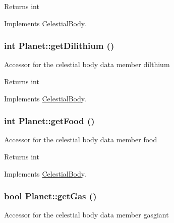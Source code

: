 \begin{DoxyReturn}{Returns}
int 
\end{DoxyReturn}


Implements \hyperlink{classCelestialBody}{CelestialBody}.

\hypertarget{classPlanet_a272240452921331e7220108df452a37d}{
\subsubsection[{getDilithium}]{\setlength{\rightskip}{0pt plus 5cm}int Planet::getDilithium ()}}
\label{d5/dec/classPlanet_a272240452921331e7220108df452a37d}
Accessor for the celestial body data member dilthium

\begin{DoxyReturn}{Returns}
int 
\end{DoxyReturn}


Implements \hyperlink{classCelestialBody}{CelestialBody}.

\hypertarget{classPlanet_a2b85fd628db9831d7ab5c7149b80cde3}{
\subsubsection[{getFood}]{\setlength{\rightskip}{0pt plus 5cm}int Planet::getFood ()}}
\label{d5/dec/classPlanet_a2b85fd628db9831d7ab5c7149b80cde3}
Accessor for the celestial body data member food

\begin{DoxyReturn}{Returns}
int 
\end{DoxyReturn}


Implements \hyperlink{classCelestialBody}{CelestialBody}.

\hypertarget{classPlanet_a1b79060982d564661119fbae3d4a1726}{
\subsubsection[{getGas}]{\setlength{\rightskip}{0pt plus 5cm}bool Planet::getGas ()}}
\label{d5/dec/classPlanet_a1b79060982d564661119fbae3d4a1726}
Accessor for the celestial body data member gasgiant

